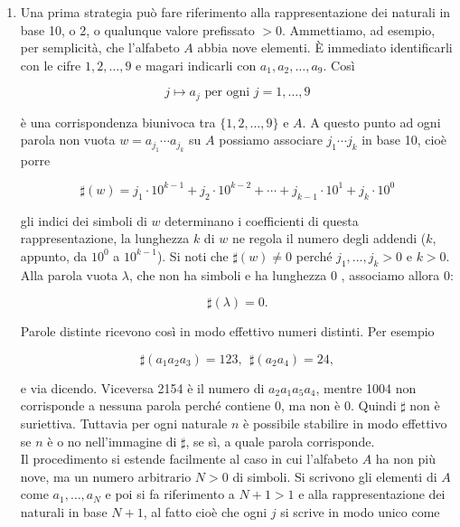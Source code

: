 \begin{enumerate}
    \item Una prima strategia può fare riferimento alla rappresentazione dei
          naturali in base 10, o 2, o qualunque valore prefissato $>0$. Ammettiamo, ad
          esempio, per semplicità, che l'alfabeto $A$ abbia nove elementi. È immediato
          identificarli con le cifre $1,2, \ldots, 9$ e magari indicarli con
          $a_1, a_2, \ldots, a_9$. Così

          \[
              j \mapsto a_j \text{ per ogni } j=1, \ldots, 9
          \]

          è una corrispondenza biunivoca tra $\{1,2, \ldots, 9\}$ e $A$. A questo
          punto ad ogni parola non vuota $w=a_{j_1} \cdots a_{j_k}$ su $A$ possiamo
          associare $j_1 \cdots j_k$ in base 10, cioè porre

          $$
              \sharp(w)=j_1 \cdot 10^{k-1}+j_2 \cdot 10^{k-2}+\cdots+j_{k-1} \cdot 10^1+j_k \cdot 10^0
          $$

          gli indici dei simboli di $w$ determinano i coefficienti di questa
          rappresentazione, la lunghezza $k$ di $w$ ne regola il numero degli addendi
          ($k$, appunto, da $10^0$ a $10^{k-1}$). Si noti che $\sharp(w) \neq 0$ perché
          $j_1, \ldots, j_k>0$ e $k>0$. Alla parola vuota $\lambda$, che non ha
          simboli e ha lunghezza 0 , associamo allora 0:

          $$
              \sharp(\lambda)=0 .
          $$

          Parole distinte ricevono così in modo effettivo numeri distinti.
          Per esempio

          $$
              \sharp\left(a_1 a_2 a_3\right)=123, \ \ \sharp\left(a_2 a_4\right)=24,
          $$

          e via dicendo. Viceversa 2154 è il numero di $a_2 a_1 a_5 a_4$, mentre
          1004 non corrisponde a nessuna parola perché contiene 0, ma non è 0.
          Quindi $\sharp$ non è suriettiva. Tuttavia per ogni naturale $n$ è
          possibile stabilire in modo effettivo se $n$ è o no nell'immagine
          di $\sharp$, se sì, a quale parola corrisponde.\\
          Il procedimento si estende facilmente al caso in cui l'alfabeto $A$ ha non
          più nove, ma un numero arbitrario $N>0$ di simboli. Si scrivono gli
          elementi di $A$ come $a_1, \ldots, a_N$ e poi si fa riferimento a $N+1>1$
          e alla rappresentazione dei naturali in base $N+1$, al fatto cioè che ogni
          $j$ si scrive in modo unico come


\end{enumerate}
